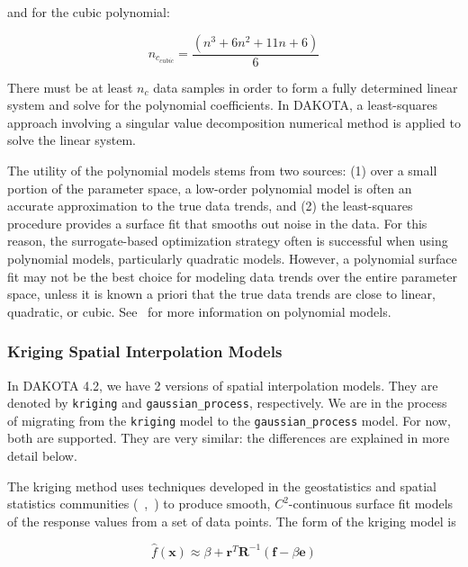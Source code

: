 and for the cubic polynomial:

\begin{equation}
  n_{c_{cubic}}=\frac{(n^{3}+6 n^{2}+11 n+6)}{6}
  \label{models:surf:equation06}
\end{equation}

There must be at least $n_{c}$ data samples in order to form a fully
determined linear system and solve for the polynomial coefficients. In
DAKOTA, a least-squares approach involving a singular value
decomposition numerical method is applied to solve the linear system.

The utility of the polynomial models stems from two sources: (1) over
a small portion of the parameter space, a low-order polynomial model
is often an accurate approximation to the true data trends, and (2)
the least-squares procedure provides a surface fit that smooths out
noise in the data. For this reason, the surrogate-based optimization
strategy often is successful when using polynomial models,
particularly quadratic models. However, a polynomial surface fit may
not be the best choice for modeling data trends over the entire
parameter space, unless it is known a priori that the true data trends
are close to linear, quadratic, or cubic. See~\cite{Mye95} for more
information on polynomial models.

\subsubsection{Kriging Spatial Interpolation Models}\label{models:surf:kriging}

In DAKOTA 4.2, we have 2 versions of spatial interpolation models.
They are denoted by \texttt{kriging} and \texttt{gaussian\_process},
respectively.  We are in the process of migrating from the \texttt{kriging}
model to the \texttt{gaussian\_process} model.  For now, both are supported.
They are very similar:  the differences are explained in more detail below.

The kriging method uses techniques developed in the geostatistics and
spatial statistics communities (~\cite{Cre91},~\cite{Koe96}) to produce
smooth, $C^{2}$-continuous surface fit models of the response values
from a set of data points. The form of the kriging model is

\begin{equation}
  \hat{f}(\mathbf{x}) \approx \beta +
  \mathbf{r}^{T}\mathbf{R}^{-1}(\mathbf{f}-\beta\mathbf{e})
  \label{models:surf:equation08}
\end{equation}

